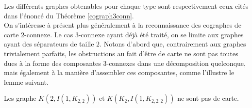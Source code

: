 \documentclass{scrartcl}
\begin{document}
\begin{flushleft}
Les différents graphes obtenables pour chaque type sont respectivement ceux cités dans l'énoncé du Théorème \ref{cograph3conn}.\\
On s'intéresse à présent plus généralement à la reconnaissance des cographes de carte $2$-connexe. Le cas $3$-connexe ayant déjà été traité,
on se limite aux graphes ayant des séparateurs de taille $2$. Notons d'abord que, contrairement aux graphes trivialement parfaits, les
obstructions au fait d'être de carte ne sont pas toutes dues à la forme des composantes $3$-connexes dans une décomposition quelconque,
mais également à la manière d'assembler ces composantes, comme l'illustre le lemme suivant.

\begin{lem}\label{2connstrictForbid}
    Les graphe $K(2, I(1, K_{2,2}))$ et $K(K_2, I(1, K_{2,2,2}))$ ne sont pas de carte.
\end{lem}


\end{flushleft}
\end{document}
